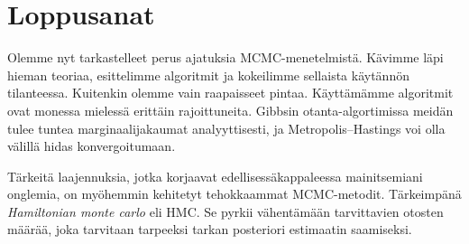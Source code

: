 \chapter{Loppusanat}

Olemme nyt tarkastelleet perus ajatuksia MCMC-menetelmistä. Kävimme läpi hieman teoriaa, esittelimme algoritmit ja kokeilimme sellaista käytännön tilanteessa. Kuitenkin olemme vain raapaisseet pintaa. Käyttämämme algoritmit ovat monessa mielessä erittäin rajoittuneita. Gibbsin otanta-algortimissa meidän tulee tuntea marginaalijakaumat analyyttisesti, ja Metropolis--Hastings voi olla välillä hidas konvergoitumaan. 

Tärkeitä laajennuksia, jotka korjaavat edellisessäkappaleessa mainitsemiani onglemia, on myöhemmin kehitetyt tehokkaammat MCMC-metodit. Tärkeimpänä \textit{Hamiltonian monte carlo} eli HMC. Se pyrkii vähentämään tarvittavien otosten määrää, joka tarvitaan tarpeeksi tarkan posteriori estimaatin saamiseksi.